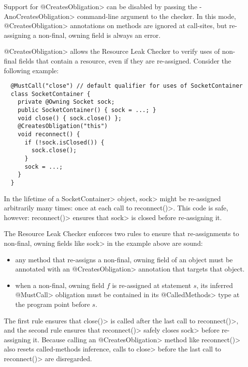 Support for \<@CreatesObligation> can be disabled by passing the \<-AnoCreatesObligation> command-line
argument to the checker. In this mode, \<@CreatesObligation> annotations on methods are ignored at call-sites,
but re-assigning a non-final, owning field is always an error.


\<@CreatesObligation> allows the Resource Leak Checker to verify uses of non-final fields
that contain a resource, even if they are re-assigned. Consider
the following example:

\begin{verbatim}
  @MustCall("close") // default qualifier for uses of SocketContainer
  class SocketContainer {
    private @Owning Socket sock;
    public SocketContainer() { sock = ...; }
    void close() { sock.close() };
    @CreatesObligation("this")
    void reconnect() {
      if (!sock.isClosed()) {
        sock.close();
      }
      sock = ...;
    }
  }
\end{verbatim}

In the lifetime of a \<SocketContainer> object, \<sock>
might be re-assigned arbitrarily many times: once at each
call to \<reconnect()>. This code is safe, however: \<reconnect()>
ensures that \<sock> is closed before re-assigning it.

The Resource Leak Checker enforces two rules to ensure that
re-assignments to non-final, owning fields like \<sock> in the example
above are sound:
\begin{itemize}
\item any method that re-assigns a non-final, owning field of an object
  must be annotated with an \<@CreatesObligation> annotation
  that targets that object.
\item when a non-final, owning field $f$ is re-assigned at statement $s$,
  its inferred \<@MustCall> obligation must be contained in its \<@CalledMethods>
  type at the program point before $s$.
\end{itemize}
\noindent
The first rule ensures that \<close()> is called after the last call
to \<reconnect()>, and the second rule ensures that \<reconnect()>
safely closes \<sock> before re-assigning it. Because calling
an \<@CreatesObligation> method like \<reconnect()> also resets called-methods
inference, calls to \<close> before the last call to \<reconnect()>
are disregarded.


